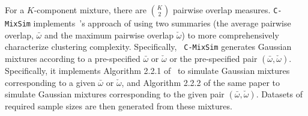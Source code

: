 \documentclass[twoside,11pt]{article}
\begin{document}
For a $K$-component mixture, there are $K\choose 2$ pairwise overlap
measures. {\tt C-MixSim} implements~\citet{maitraandmelnykov09}'s
approach of using two summaries (the average pairwise overlap,
$\bar\omega$ and the maximum pairwise overlap $\check\omega$) to more
comprehensively characterize clustering complexity. Specifically, {\tt
  C-MixSim} generates Gaussian mixtures according to a pre-specified
$\bar\omega$ or $\check\omega$ or the pre-specified pair
$(\bar\omega,\check\omega)$. Specifically, it implements Algorithm
2.2.1 of~\citet{maitraandmelnykov09} to simulate Gaussian mixtures
corresponding to a given $\bar\omega$ or $\check\omega$, and Algorithm
2.2.2 of the same paper to simulate Gaussian mixtures corresponding to
the given pair $(\bar\omega,\check\omega)$. Datasets of required
sample sizes are then generated from these mixtures.
 
\end{document}
